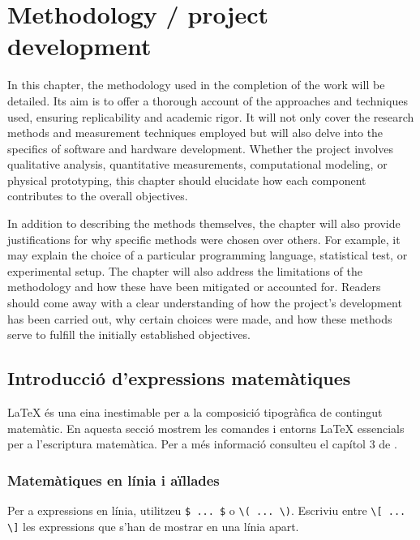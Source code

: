 \else
  \chapter{Methodology / project development}

  In this chapter, the methodology used in the completion of the work will be detailed. Its aim is to offer a thorough account of the approaches and techniques used, ensuring replicability and academic rigor. It will not only cover the research methods and measurement techniques employed but will also delve into the specifics of software and hardware development. Whether the project involves qualitative analysis, quantitative measurements, computational modeling, or physical prototyping, this chapter should elucidate how each component contributes to the overall objectives.
  
  In addition to describing the methods themselves, the chapter will also provide justifications for why specific methods were chosen over others. For example, it may explain the choice of a particular programming language, statistical test, or experimental setup. The chapter will also address the limitations of the methodology and how these have been mitigated or accounted for. Readers should come away with a clear understanding of how the project's development has been carried out, why certain choices were made, and how these methods serve to fulfill the initially established objectives.

\fi

\ifcase\doclanguage\or
  \section{Introducció d'expressions matemàtiques}
    
  \LaTeX{} és una eina inestimable per a la composició tipogràfica de contingut matemàtic. En aquesta secció mostrem les comandes i entorns \LaTeX{} essencials per a l'escriptura matemàtica. Per a més informació consulteu el capítol 3 de \cite{notsoshort}.
    
  \subsection{Matemàtiques en línia i aïllades}
    
  Per a expressions en línia, utilitzeu \verb|$ ... $| o \verb|\( ... \)|. Escriviu entre \verb|\[ ... \]| les expressions que s'han de mostrar en una línia apart.

\or
